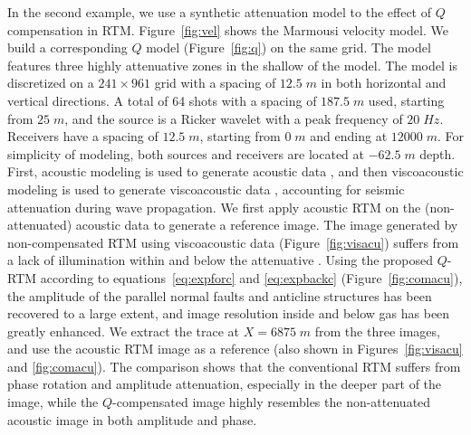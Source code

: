 In the second example, we use a synthetic attenuation model to  the effect of $Q$ compensation in RTM. Figure~\ref{fig:vel} shows the Marmousi velocity model. We build a corresponding $Q$ model (Figure~\ref{fig:q}) on the same grid. The model features three highly attenuative zones in the shallow  of the model. The model is discretized on a $241 \times 961$ grid with a spacing of $12.5\;m$ in both horizontal and vertical directions. A total of 64 shots with a spacing of $187.5\;m$  used, starting from $25\;m$, and the source is a Ricker wavelet with a peak frequency of $20\;Hz$. Receivers have a spacing of $12.5\;m$, starting from $0\;m$ and ending at $12000\;m$. For simplicity of modeling, both sources and receivers are located at $-62.5\;m$ depth. First, acoustic modeling is used to generate acoustic data , and then viscoacoustic modeling is used to generate viscoacoustic data , accounting for seismic attenuation during wave propagation. We first apply acoustic RTM on the (non-attenuated) acoustic data to generate a reference image.
The image generated by non-compensated RTM using viscoacoustic data (Figure~\ref{fig:visacu}) suffers from a lack of illumination within and below the attenuative . Using the proposed $Q$-RTM according to equations~\ref{eq:expforc} and \ref{eq:expbackc} (Figure~\ref{fig:comacu}), the amplitude of the parallel normal faults and anticline structures has been recovered to a large extent, and image resolution inside and below gas has been greatly enhanced. We extract the trace at $X=6875\;m$ from the three images, and use the acoustic RTM image  as a reference (also shown in Figures~\ref{fig:visacu} and \ref{fig:comacu}). The comparison shows that the conventional RTM suffers from phase rotation and amplitude attenuation, especially in the deeper part of the image, while the $Q$-compensated image highly resembles the non-attenuated acoustic image in both amplitude and phase. 

